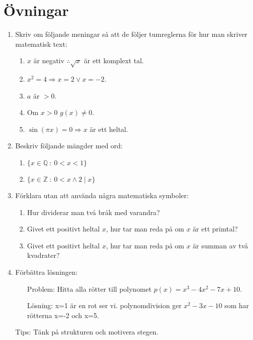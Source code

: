 \documentclass[titlepage]{article}
\begin{document}
\section{Övningar}
\begin{enumerate}
    \item Skriv om följande meningar så att de följer tumreglerna för hur man skriver matematisk text:
    \begin{enumerate}[label=(\alph*)]
        \item $x$ är negativ $\therefore \sqrt{x}$ är ett komplext tal.
        \item $x^2 = 4 \Rightarrow x=2 \vee x=-2$.
        \item $a$ är $>0$.
        \item Om $x>0$ $g(x) \neq 0$.
        \item $\sin(\pi x)= 0\Rightarrow x$ är ett heltal. 
    \end{enumerate}
    \item Beskriv följande mängder med ord:
    \begin{enumerate}
        \item $\{x \in \mathbb{Q} \: : \: 0<x<1\}$
        \item $\{x \in \mathbb{Z} \: : \: 0 < x \wedge 2 \mid x\}$
    \end{enumerate}
    \item Förklara utan att använda några matematiska symboler:
    \begin{enumerate}[label=(\alph*)]
        \item Hur dividerar man två bråk med varandra?
        \item Givet ett positivt heltal $x$, hur tar man reda på om $x$ är ett primtal?
        \item Givet ett positivt heltal $x$, hur tar man reda på om $x$ är summan av två kvadrater?
    \end{enumerate}
    \item Förbättra lösningen:
    \begin{enumerate}[leftmargin=20mm]
        \item[Problem:] Hitta alla rötter till polynomet $p(x)=x^3 - 4x^2 - 7x + 10$.
        \item[Lösning:] x=1 är en rot ser vi. polynomdivision ger $x^2-3x-10$ som har rötterna x=-2 och x=5.
    \end{enumerate}
    Tips: Tänk på strukturen och motivera stegen.
\end{enumerate}


\newpage

\end{document}
